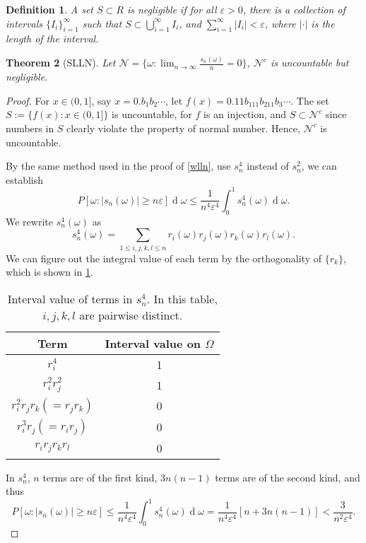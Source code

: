 \documentclass[12pt]{article}
\newtheorem{theorem}{Theorem}
\newtheorem{definition}[theorem]{Definition}
\newcommand\nn{\mathcal{N}}
\newcommand\eps{\varepsilon}
\DeclareMathOperator{\diff}{d}
\begin{document}
\begin{definition}
    A set $S \subset R$ is negligible if 
    for all $\eps > 0$, there is a collection of intervals
    $\{I_i\}_{i=1}^{\infty}$ such that $S \subset \bigcup_{i = 1}^{\infty} I_i$,
    and $\sum_{i=1}^\infty |I_i| < \eps$,
    where $|\cdot|$ is the length of the interval.
\end{definition}
\begin{theorem}[SLLN]
   Let $\nn = \{\omega : \lim_{n \to \infty} \frac{s_n(\omega)}{n} = 0\}$,
   $\nn^c$ is uncountable but negligible.
\end{theorem}
\begin{proof}
    For $x \in (0,1]$, say $x = 0.b_1b_2\cdots$, 
    let $f(x) = 0.11b_111b_211b_3\cdots.$ The set 
    $S := \{f(x) : x\in(0,1]\}$ is uncountable, for $f$
    is an injection, and $S \subset \nn^c$ since numbers in $S$
    clearly violate the property of normal number. Hence, 
    $\nn^c$ is uncountable.

    By the same method used in the proof of \cref{wlln}, use $s_n^4$ instead of $s_n^2$,
    we can establish 
    \begin{equation} 
        P[\omega : |s_n(\omega)| \ge n\eps]   \diff \omega
        \leq \frac{1}{n^4\eps^4} \int_0^1 s_n^4(\omega) \diff \omega. 
    \end{equation}
    We rewrite $s_n^4(\omega)$ as 
    \begin{equation}
        s_n^4(\omega) = \sum_{1 \leq i,j,k,l \leq n} 
        r_i(\omega)  r_j(\omega) r_k(\omega)  r_l(\omega). 
    \end{equation}
    We can figure out the integral value of each term 
    by the orthogonality of $\{r_k\}$, which is 
    shown in \cref{table}.
    \begin{table}[h]
        \centering
        \begin{tabular}{c|c}
            \toprule
                Term & Interval value on $\Omega$\\
            \midrule
                $r_i^4$ & 1 \\
                $r_i^2r_j^2$ & 1\\
                $r_i^2r_jr_k (= r_jr_k)$ & 0 \\
                $r_i^3r_j ( = r_ir_j)$ & 0 \\
                $r_ir_jr_kr_l$   & 0  \\
            \bottomrule
        \end{tabular}
        \caption{Interval value of terms in $s_n^4$.  In this table, $i,j,k,l$ are pairwise distinct.}
        \label{table}
    \end{table}
    In $s_n^4$, $n$ terms are of the first kind, 
    $3n(n-1)$ terms are of the second kind, and thus 
    \begin{equation} \label{main}
        P[\omega : |s_n(\omega)| \ge n\eps] \leq  
        \frac{1}{n^4\eps^4} \int_0^1 s_n^4(\omega) \diff \omega 
        =\frac{1}{n^4\eps^4} [n + 3n(n-1)] < \frac{3}{n^2\eps{^4}}.
    \end{equation}


\end{proof}
\end{document}
